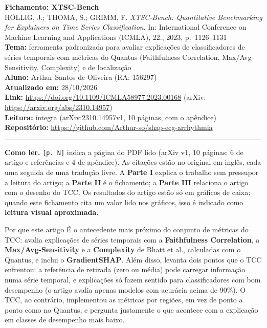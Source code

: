 \documentclass[11pt,a4paper]{article}
\begin{document}
\sloppy

\begin{center}
    {\LARGE \textbf{Fichamento: XTSC-Bench}} \\[0.35em]
    {\large HÖLLIG, J.; THOMA, S.; GRIMM, F. \textit{XTSC-Bench: Quantitative Benchmarking for Explainers on Time Series Classification}. In: International Conference on Machine Learning and Applications (ICMLA), 22., 2023, p.~1126--1131} \\[0.3em]
    \textbf{Tema:} ferramenta padronizada para avaliar explicações de classificadores de séries temporais com métricas do Quantus (Faithfulness Correlation, Max/Avg-Sensitivity, Complexity) e de localização \\[0.2em]
    \textbf{Aluno:} Arthur Santos de Oliveira (RA: 156297) \\[0.2em]
    \textbf{Atualizado em:} 28/10/2026 \\[0.2em]
    \textbf{Link:} \url{https://doi.org/10.1109/ICMLA58977.2023.00168} (arXiv: \url{https://arxiv.org/abs/2310.14957}) \\[0.2em]
    \textbf{Leitura:} íntegra (arXiv:2310.14957v1, 10 páginas, com o apêndice) \\[0.2em]
    \textbf{Repositório:} \url{https://github.com/Arthur-so/shap-ecg-arrhythmia}
\end{center}
\vspace{-0.5em}
\hrule
\vspace{0.8em}

\textbf{Como ler.} \texttt{[p. N]} indica a página do PDF lido (arXiv v1, 10 páginas: 6 de artigo e referências e 4 de apêndice). As citações estão no original em inglês, cada uma seguida de uma tradução livre. A \textbf{Parte I} explica o trabalho sem pressupor a leitura do artigo; a \textbf{Parte II} é o fichamento; a \textbf{Parte III} relaciona o artigo com o desenho do TCC. Os resultados do artigo estão só em gráficos de caixa; quando este fichamento cita um valor lido nos gráficos, isso é indicado como \textbf{leitura visual aproximada}.

\begin{infobox}[note]{Por que este artigo}
É o antecedente mais próximo do conjunto de métricas do TCC: avalia explicações de séries temporais com a \textbf{Faithfulness Correlation}, a \textbf{Max/Avg-Sensitivity} e a \textbf{Complexity} de Bhatt et al., calculadas com o Quantus, e inclui o \textbf{GradientSHAP}. Além disso, levanta dois pontos que o TCC enfrentou: a referência de retirada (zero ou média) pode carregar informação numa série temporal, e explicações só fazem sentido para classificadores com bom desempenho (o artigo avalia apenas modelos com acurácia acima de 90\%). O TCC, ao contrário, implementou as métricas por regiões, em vez de ponto a ponto como no Quantus, e pergunta justamente o que acontece com a explicação em classes de desempenho mais baixo.
\end{infobox}
\end{document}
